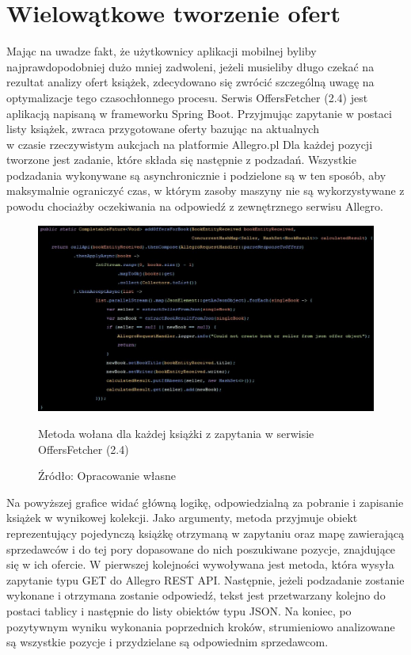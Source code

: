 \section{Wielowątkowe tworzenie ofert}
Mając na uwadze fakt, że użytkownicy aplikacji mobilnej byliby najprawdopodobniej dużo mniej zadwoleni, jeżeli musieliby długo czekać na rezultat analizy ofert książek, zdecydowano się zwrócić szczególną uwagę na optymalizacje tego czasochłonnego procesu.
Serwis OffersFetcher (2.4) jest aplikacją napisaną w frameworku Spring Boot. Przyjmując zapytanie w postaci listy książek, zwraca przygotowane oferty bazując na aktualnych\\w czasie rzeczywistym aukcjach na platformie Allegro.pl\newline
Dla każdej pozycji tworzone jest zadanie, które składa się następnie z podzadań. Wszystkie podzadania wykonywane są asynchronicznie i podzielone są w ten sposób, aby maksymalnie ograniczyć czas, w którym zasoby maszyny nie są wykorzystywane z powodu chociażby oczekiwania na odpowiedź z zewnętrznego serwisu Allegro.
\begin{figure}[H]
	\centering
	\includegraphics[width=\linewidth]{tasks.pdf}
	\caption{\centering Metoda wołana dla każdej książki z zapytania w serwisie OffersFetcher (2.4)}
	\caption*{\centering Źródło: {Opracowanie własne}}
\end{figure}
Na powyższej grafice widać główną logikę, odpowiedzialną za pobranie i zapisanie książek w wynikowej kolekcji. Jako argumenty, metoda przyjmuje obiekt reprezentujący pojedynczą książkę otrzymaną w zapytaniu oraz mapę zawierającą sprzedawców i do tej pory dopasowane do nich poszukiwane pozycje, znajdujące się w ich ofercie.
W pierwszej kolejności wywoływana jest metoda, która wysyła zapytanie typu GET do Allegro REST API. Następnie, jeżeli podzadanie zostanie wykonane i otrzymana zostanie odpowiedź, tekst jest przetwarzany kolejno do postaci tablicy i następnie do listy obiektów typu JSON.
Na koniec, po pozytywnym wyniku wykonania poprzednich kroków, strumieniowo analizowane są wszystkie pozycje i przydzielane są odpowiednim sprzedawcom.

